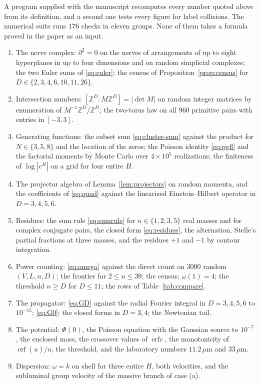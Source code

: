 \documentclass[aps,prd,10pt,twocolumn,superscriptaddress,nofootinbib,floatfix,longbibliography,showpacs,showkeys]{revtex4-2}
\theoremstyle{plain}
\theoremstyle{definition}
\theoremstyle{remark}
\newcommand{\bZ}{\mathbb{Z}}
\newcommand{\erf}{\operatorname{erf}}
\newcommand{\erfc}{\operatorname{erfc}}
\begin{document}
A program supplied with the manuscript recomputes every number quoted above from its definition, and a second one tests every figure for label collisions. The numerical suite runs $176$ checks in eleven groups. None of them takes a formula proved in the paper as an input.
\begin{enumerate}[label=\textup{(\arabic*)},leftmargin=2.4em,itemsep=0.1em]
\item The nerve complex: $\partial^2=0$ on the nerves of arrangements of up to eight hyperplanes in up to four dimensions and on random simplicial complexes; the two Euler sums of \eqref{eq:euler}; the census of Proposition~\ref{prop:census} for $D\in\{2,3,4,6,10,11,26\}$.
\item Intersection numbers: $[\bZ^D:M\bZ^D]=|\det M|$ on random integer matrices by enumeration of $M^{-1}\bZ^D/\bZ^D$; the two-torus law on all $960$ primitive pairs with entries in $[-3,3]$.
\item Generating functions: the subset sum \eqref{eq:cluster-sum} against the product for $N\in\{3,5,8\}$ and the location of the zeros; the Poisson identity \eqref{eq:pgfl} and the factorial moments by Monte Carlo over $4\times10^5$ realizations; the finiteness of $\log|e^{H}|$ on a grid for four entire $H$.
\item The projector algebra of Lemma~\ref{lem:projectors} on random momenta, and the coefficients of \eqref{eq:quad} against the linearized Einstein--Hilbert operator in $D=3,4,5,6$.
\item Residues: the sum rule \eqref{eq:sumrule} for $n\in\{1,2,3,5\}$ real masses and for complex conjugate pairs, the closed form \eqref{eq:residues}, the alternation, Stelle's partial fractions at three masses, and the residues $+1$ and $-1$ by contour integration.
\item Power counting: \eqref{eq:omega} against the direct count on $3000$ random $(V,L,n,D)$; the frontier for $2\le n\le39$; the census; $\omega(1)=4$; the threshold $n\ge D$ for $D\le11$; the rows of Table~\ref{tab:compare}.
\item The propagator: \eqref{eq:GD} against the radial Fourier integral in $D=3,4,5,6$ to $10^{-15}$; \eqref{eq:G0}; the closed forms in $D=3,4$; the Newtonian tail.
\item The potential: $\Phi(0)$, the Poisson equation with the Gaussian source to $10^{-7}$, the enclosed mass, the crossover values of $\erfc$, the monotonicity of $\erf(u)/u$, the threshold, and the laboratory numbers $11.2\,\mu$m and $33\,\mu$m.
\item Dispersion: $\omega=k$ on shell for three entire $H$, both velocities, and the subluminal group velocity of the massive branch of case (a).

\end{enumerate}
\end{document}
